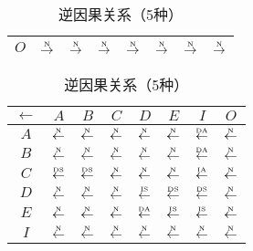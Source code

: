 \begin{table}[htbp]
\begin{subtable}{0.45\textwidth}
\begin{tabular}{|c|c|c|c|c|c|c|c|}
	  $O$ & $\overset{\text{\tiny{N}}}{\rightarrow}$ & $\overset{\text{\tiny{N}}}{\rightarrow}$ & $\overset{\text{\tiny{N}}}{\rightarrow}$ & $\overset{\text{\tiny{N}}}{\rightarrow}$ & $\overset{\text{\tiny{N}}}{\rightarrow}$ & $\overset{\text{\tiny{N}}}{\rightarrow}$ & $\overset{\text{\tiny{N}}}{\rightarrow}$\\ \hline
	\end{tabular}
  \end{subtable}
  \hspace{1em}
  \begin{subtable}{0.45\textwidth}
    \centering
    \caption{逆因果关系（5种）}
	\begin{tabular}{|c|c|c|c|c|c|c|c|} \hline
		$\leftarrow$ & $A$ & $B$ & $C$ & $D$ & $E$ & $I$ & $O$\\ \hline
		$A$ & $\overset{\text{\tiny{N}}}{\leftarrow}$ & $\overset{\text{\tiny{N}}}{\leftarrow}$ & $\overset{\text{\tiny{N}}}{\leftarrow}$ & $\overset{\text{\tiny{N}}}{\leftarrow}$ & $\overset{\text{\tiny{N}}}{\leftarrow}$ & $\overset{\text{\tiny{DA}}}{\leftarrow}$ & $\overset{\text{\tiny{N}}}{\leftarrow}$\\ \hline
		$B$ & $\overset{\text{\tiny{N}}}{\leftarrow}$ & $\overset{\text{\tiny{N}}}{\leftarrow}$ & $\overset{\text{\tiny{N}}}{\leftarrow}$ & $\overset{\text{\tiny{N}}}{\leftarrow}$ & $\overset{\text{\tiny{N}}}{\leftarrow}$ & $\overset{\text{\tiny{DA}}}{\leftarrow}$ & $\overset{\text{\tiny{N}}}{\leftarrow}$\\ \hline
		$C$ & $\overset{\text{\tiny{DS}}}{\leftarrow}$ & $\overset{\text{\tiny{DS}}}{\leftarrow}$ & $\overset{\text{\tiny{N}}}{\leftarrow}$ & $\overset{\text{\tiny{N}}}{\leftarrow}$ & $\overset{\text{\tiny{N}}}{\leftarrow}$ & $\overset{\text{\tiny{IA}}}{\leftarrow}$ & $\overset{\text{\tiny{N}}}{\leftarrow}$\\ \hline
		$D$ & $\overset{\text{\tiny{N}}}{\leftarrow}$ & $\overset{\text{\tiny{N}}}{\leftarrow}$ & $\overset{\text{\tiny{N}}}{\leftarrow}$ & $\overset{\text{\tiny{IS}}}{\leftarrow}$ & $\overset{\text{\tiny{DS}}}{\leftarrow}$ & $\overset{\text{\tiny{DS}}}{\leftarrow}$ & $\overset{\text{\tiny{N}}}{\leftarrow}$\\ \hline
		$E$ & $\overset{\text{\tiny{N}}}{\leftarrow}$ & $\overset{\text{\tiny{N}}}{\leftarrow}$ & $\overset{\text{\tiny{N}}}{\leftarrow}$ & $\overset{\text{\tiny{DA}}}{\leftarrow}$ & $\overset{\text{\tiny{IS}}}{\leftarrow}$ & $\overset{\text{\tiny{IS}}}{\leftarrow}$ & $\overset{\text{\tiny{N}}}{\leftarrow}$\\ \hline
		$I$ & $\overset{\text{\tiny{N}}}{\leftarrow}$ & $\overset{\text{\tiny{N}}}{\leftarrow}$ & $\overset{\text{\tiny{N}}}{\leftarrow}$ & $\overset{\text{\tiny{N}}}{\leftarrow}$ & $\overset{\text{\tiny{N}}}{\leftarrow}$ & $\overset{\text{\tiny{N}}}{\leftarrow}$ & $\overset{\text{\tiny{N}}}{\leftarrow}$\\ \hline

\end{tabular}
\end{subtable}
\end{table}
